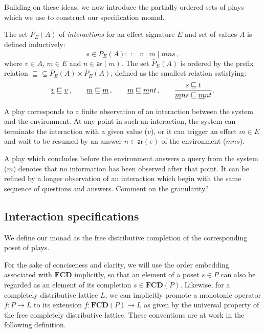 \documentclass[format=sigplan,authordraft]{acmart}
\newcommand{\kw}[1]{\ensuremath{ \mathsf{#1} }}
\begin{document}
Building on these ideas,
we now introduce the partially ordered sets of plays
which we use to construct our specification monad.

\begin{definition}
The set $\bar{P}_E(A)$ of \emph{interactions}
for an effect signature $E$ and set of values $A$
is defined inductively:
\[
  s \in \bar{P}_E(A) ::=
    \underline{v} \mid
    \underline{m} \mid
    \underline{m} n s \,,
\]
where $v \in A$, $m \in E$ and $n \in \kw{ar}(m)$.
The set $\bar{P}_E(A)$ is ordered by the prefix relation
${\sqsubseteq} \subseteq \bar{P}_E(A) \times \bar{P}_E(A)$,
defined
as the smallest relation satisfying:
\[
  \underline{v} \sqsubseteq \underline{v} \,, \qquad
  \underline{m} \sqsubseteq \underline{m} \,, \qquad
  \underline{m} \sqsubseteq \underline{m} n t \,, \qquad
  \begin{prooftree}
    \hypo{s \sqsubseteq t}
    \infer1{\underline{m} n s \sqsubseteq \underline{m} n t}
  \end{prooftree} \,.
\]
\end{definition}

A play corresponds to a finite observation of
an interaction between the system and the environment.
At any point in such an interaction,
the system can terminate the interaction with a given value ($v$),
or it can trigger an effect $m \in E$ and
wait to be resumed by
an answer $n \in \kw{ar}(e)$ of the environment
($\underline{m} n s$).

A play which concludes before
the environment answers a query from the system ($\underline{m}$)
denotes that no information has been observed after that point.
It can be refined by a longer observation
of an interaction which begin with the same sequence of
questions and answers.
{\color{gray} Comment on the granularity?}


\subsection{Interaction specifications} %

We define our monad as the free distributive completion
of the corresponding poset of plays.

For the sake of conciseness and clarity,
we will use the order embedding associated with $\mathbf{FCD}$
implicitly,
so that an element of a poset $s \in P$
can also be regarded as an element of
its completion $s \in \mathbf{FCD}(P)$.
Likewise,
for a completely distributive lattice $L$,
we can implicitly
promote a monotonic operator
$f : P \rightarrow L$
to its extension
$f : \mathbf{FCD}(P) \rightarrow L$
as given by the universal property of
the free completely distributive lattice.
These conventions are at work
in the following definition.
\end{document}
